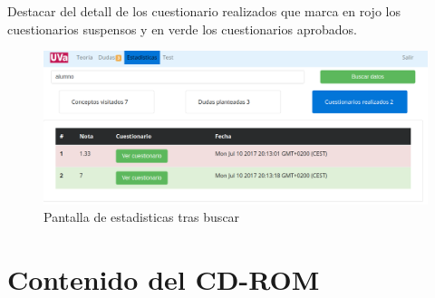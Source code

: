 \documentclass[openright,twoside,10pt]{book}
\begin{document}
    Destacar del detall de los cuestionario realizados que marca en rojo los
    cuestionarios suspensos y en verde los cuestionarios aprobados.
    
    \begin{figure}[H]
        \begin{center}
            \includegraphics[width=\textwidth]{img/manual/profesor-estadisticas-detalle3.png}
        \end{center}
        \caption{Pantalla de estadisticas tras buscar}
    \end{figure}
    
    \chapter{Contenido del CD-ROM}\label{contenido-del-cd-rom}
    
    
    \nocite{*} \printbibliography

    \cleardoublepage

\end{document}
